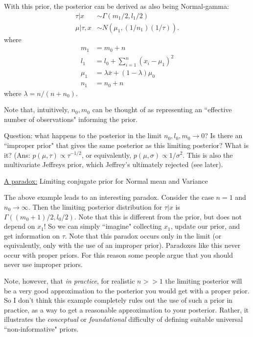 \documentclass[12pt]{article}
\def\ni{\noindent}
\begin{document}
With this prior, the posterior can be derived as
also being Normal-gamma:
\begin{align}
\tau | x & \sim \Gamma(m_1/2,l_1/2) \\
\mu | \tau, x & \sim N\left(\mu_1, (1/n_1) (1/\tau) \right).
\end{align}
where 
\begin{align}
m_1 & = m_0+n \\
l_1 & = l_0+ \sum_{i=1}^n (x_i - \mu_1)^2 \\
\mu_1 & = \lambda \bar{x} + (1-\lambda) \mu_0 \\
n_1 & = n_0+n
\end{align}
where $\lambda = n/(n+n_0)$.

Note that, intuitively,  $n_0,m_0$ can be thought of as representing an ``effective number of observations" informing the prior. 

Question: what happens to the posterior in the limit $n_0, l_0,m_0 \rightarrow 0$?
Is there an ``improper prior" that
gives the same posterior as this limiting posterior?
What is it? (Ans: $p(\mu,\tau) \propto \tau^{-1/2}$,
or equivalently, $p(\mu,\sigma) \propto 1/\sigma^2$. This is also the multivariate Jeffreys prior, which Jeffrey's ultimately rejected (see later).

\ni\underline{A  paradox:} Limiting conjugate prior for Normal mean and Variance
\vskip 2mm

The above example leads to an interesting paradox. Consider the case $n=1$ and $n_0 \rightarrow \infty$. Then the limiting posterior distribution for $\tau | x$ is  $\Gamma( (m_0+1)/2,l_0/2)$. Note that this is different from the
prior, but does not depend on $x_1$! So we can simply ``imagine" collecting $x_1$, update
our prior, and get information on $\tau$.
Note that this paradox occurs only in the limit
(or equivalently, only with the use of an
improper prior). Paradoxes like this
never occur with proper priors. For this reason
some people argue that you should never use improper priors. 

Note, however, that {\it in practice}, for realistic $n >>1$ the limiting posterior will
be a very good approximation to the posterior
you would get with a proper prior. So I don't think
this example completely rules out the use of such a prior in practice, as a way to get a reasonable approximation to your posterior. Rather, it illustrates the {\it conceptual} or {\it foundational} difficulty of defining
suitable universal ``non-informative" priors. 
\end{document}
